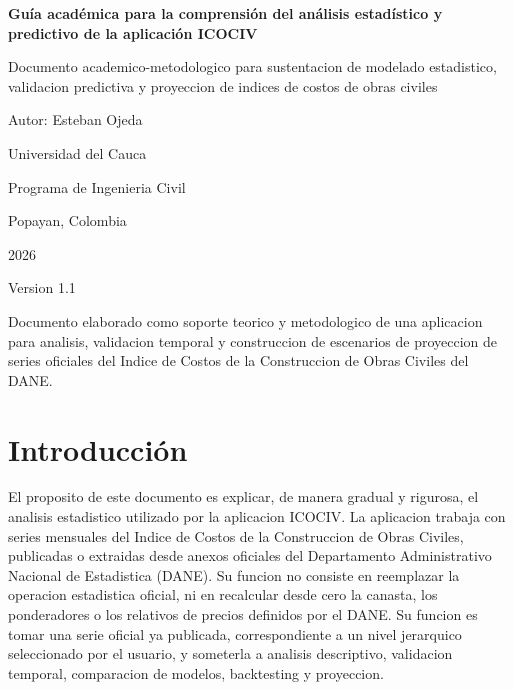 ﻿\documentclass[12pt,letterpaper]{article}
\newcommand{\ICOCIV}{ICOCIV}
\begin{document}
\begin{titlepage}
    \centering
    \vspace*{1.4cm}
    {\Large\bfseries Guía académica para la comprensión del análisis estadístico y predictivo de la aplicación ICOCIV\par}
    \vspace{0.5cm}
    {\large Documento academico-metodologico para sustentacion de modelado estadistico, validacion predictiva y proyeccion de indices de costos de obras civiles\par}
    \vspace{1.6cm}
    {\large Autor: Esteban Ojeda\par}
    \vspace{0.4cm}
    {\large Universidad del Cauca\par}
    {\large Programa de Ingenieria Civil\par}
    \vspace{0.8cm}
    {\large Popayan, Colombia\par}
    {\large 2026\par}
    \vspace{0.8cm}
    {\large Version 1.1\par}
    \vfill
    {\small Documento elaborado como soporte teorico y metodologico de una aplicacion para analisis, validacion temporal y construccion de escenarios de proyeccion de series oficiales del Indice de Costos de la Construccion de Obras Civiles del DANE.}
\end{titlepage}

\tableofcontents
\newpage
{}

\section{Introducción}

El proposito de este documento es explicar, de manera gradual y rigurosa, el analisis estadistico utilizado por la aplicacion \ICOCIV. La aplicacion trabaja con series mensuales del Indice de Costos de la Construccion de Obras Civiles, publicadas o extraidas desde anexos oficiales del Departamento Administrativo Nacional de Estadistica (DANE). Su funcion no consiste en reemplazar la operacion estadistica oficial, ni en recalcular desde cero la canasta, los ponderadores o los relativos de precios definidos por el DANE. Su funcion es tomar una serie oficial ya publicada, correspondiente a un nivel jerarquico seleccionado por el usuario, y someterla a analisis descriptivo, validacion temporal, comparacion de modelos, backtesting y proyeccion.
\end{document}

